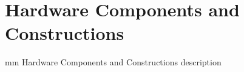 \section{Hardware Components and Constructions}

mm Hardware Components and Constructions description

